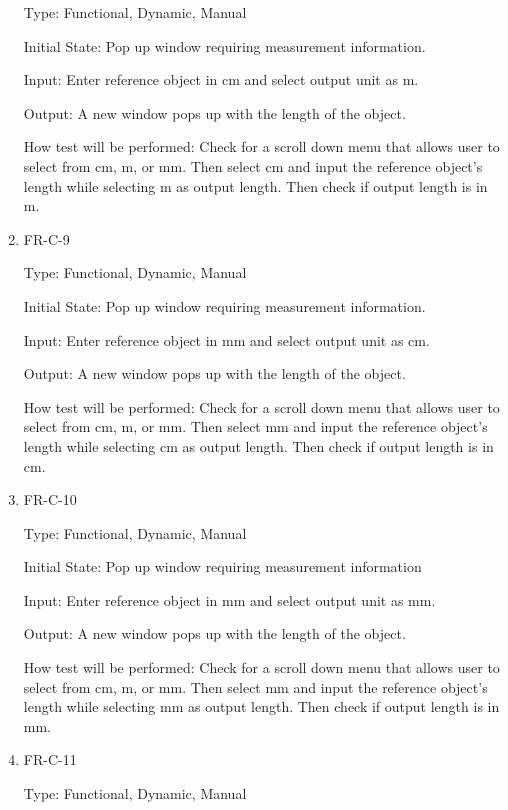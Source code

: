 \documentclass[12pt, titlepage]{article}
\begin{document}
\begin{enumerate}
					Type: Functional, Dynamic, Manual
					
					Initial State: Pop up window requiring measurement information.
					
					Input: Enter reference object in cm and select output unit as m.
					
					Output: A new window pops up with the length of the object.
					
					How test will be performed: Check for a scroll down menu that allows user to select from cm, m, or mm. Then select cm and input the reference object's length while selecting m as output length. Then check if output length is in m.
				
				\item{FR-C-9\\}
					
					Type: Functional, Dynamic, Manual
					
					Initial State: Pop up window requiring measurement information.
					
					Input: Enter reference object in mm and select output unit as cm.
					
					Output: A new window pops up with the length of the object.
					
					How test will be performed: Check for a scroll down menu that allows user to select from cm, m, or mm. Then select mm and input the reference object's length while selecting cm as output length. Then check if output length is in cm.
					
				\item{FR-C-10\\}
					
					Type: Functional, Dynamic, Manual
					
					Initial State: Pop up window requiring measurement information
					
					Input: Enter reference object in mm and select output unit as mm.
					
					Output: A new window pops up with the length of the object.
					
					How test will be performed: Check for a scroll down menu that allows user to select from cm, m, or mm. Then select mm and input the reference object's length while selecting mm as output length. Then check if output length is in mm.
				
				\item{FR-C-11\\}
					
					Type: Functional, Dynamic, Manual
					

\end{enumerate}
\end{document}
